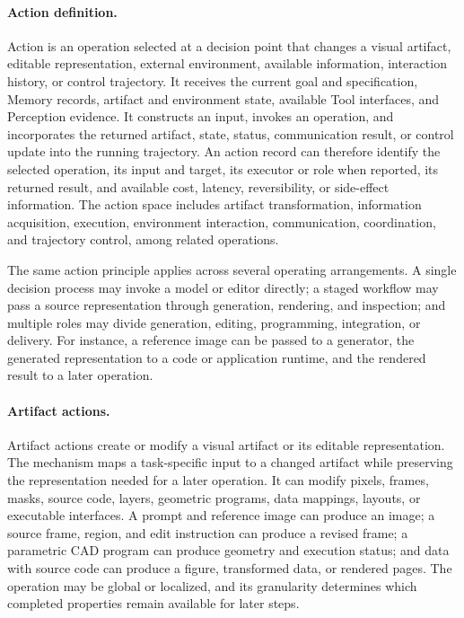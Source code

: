 \paragraph{Action definition.}
Action is an operation selected at a decision point that changes a visual artifact, editable representation, external environment, available information, interaction history, or control trajectory. It receives the current goal and specification, Memory records, artifact and environment state, available Tool interfaces, and Perception evidence. It constructs an input, invokes an operation, and incorporates the returned artifact, state, status, communication result, or control update into the running trajectory. An action record can therefore identify the selected operation, its input and target, its executor or role when reported, its returned result, and available cost, latency, reversibility, or side-effect information. The action space includes artifact transformation, information acquisition, execution, environment interaction, communication, coordination, and trajectory control, among related operations.

The same action principle applies across several operating arrangements. A single decision process may invoke a model or editor directly; a staged workflow may pass a source representation through generation, rendering, and inspection; and multiple roles may divide generation, editing, programming, integration, or delivery. For instance, a reference image can be passed to a generator, the generated representation to a code or application runtime, and the rendered result to a later operation.

\paragraph{Artifact actions.}
Artifact actions create or modify a visual artifact or its editable representation. The mechanism maps a task-specific input to a changed artifact while preserving the representation needed for a later operation. It can modify pixels, frames, masks, source code, layers, geometric programs, data mappings, layouts, or executable interfaces. A prompt and reference image can produce an image; a source frame, region, and edit instruction can produce a revised frame; a parametric CAD program can produce geometry and execution status; and data with source code can produce a figure, transformed data, or rendered pages. The operation may be global or localized, and its granularity determines which completed properties remain available for later steps.

